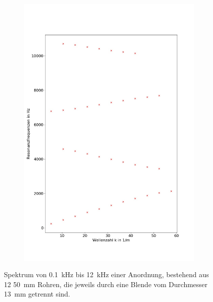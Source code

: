 \begin{figure}
\begin{subfigure}{0.34\textwidth}
\includegraphics[width=\textwidth]{content/Scripts/4b_5_red.jpg}
\end{subfigure}
\caption{Spektrum von 0.1~kHz bis 12~kHz einer Anordnung, bestehend aus 12 50~mm Rohren, die jeweils durch eine Blende vom Durchmesser 13~mm getrennt sind.}
\label{fig:4b_5_12}
\end{figure}
